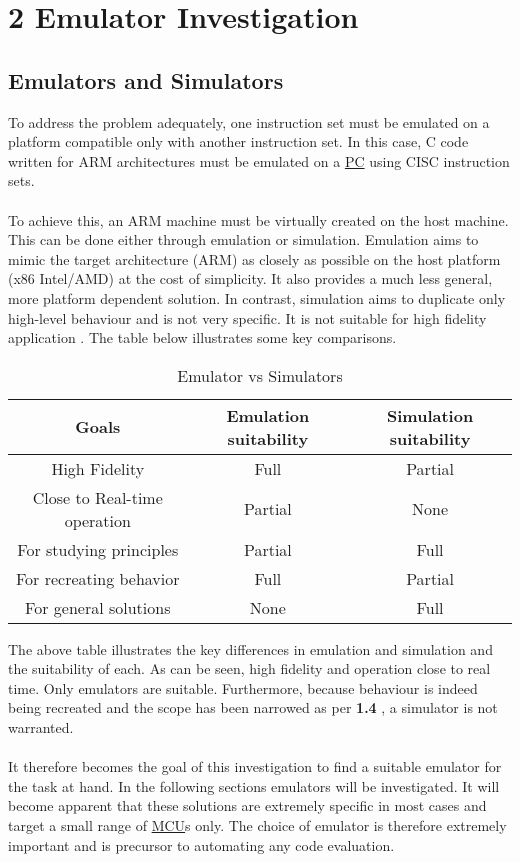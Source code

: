 

\chapter*{2 Emulator Investigation}
\setcounter{chapter}{2}
\setcounter{section}{0}
\setcounter{figure}{0}
\setcounter{table}{0}
\label{2emul}

\section{Emulators and Simulators}
\label{emuVsSim}
To address the problem adequately, one instruction set must be emulated on a platform compatible only with another instruction set. In this case, C code written for ARM architectures must be emulated on a \hyperref[listAbr]{PC} using CISC instruction sets.
\\\\
To achieve this, an ARM machine must be virtually created on the host machine. This can be done either through emulation or simulation. Emulation aims to mimic the target architecture (ARM) as closely as possible on the host platform (x86 Intel/AMD) at the cost of simplicity. It also provides a much less general, more platform dependent solution. In contrast, simulation aims to duplicate only high-level behaviour and is not very specific. It is not suitable for high fidelity application \cite{Chris}. The table below illustrates some key comparisons.

\begin{table}[H]
\begin{tabular}{ |c|c|c| } 
 \hline
 Goals & Emulation suitability & Simulation suitability \\ 
 \hline
 High Fidelity & Full & Partial \\ 
 Close to Real-time operation& Partial & None \\ 
 For studying principles & Partial & Full\\ 
 For recreating behavior & Full & Partial\\ 
 For general solutions & None & Full\\ 
 \hline
\end{tabular}
\caption{Emulator vs Simulators}
\label{table:1}
\end{table}

The above table illustrates the key differences in emulation and simulation and the suitability of each. As can be seen, high fidelity and operation close to real time. Only emulators are suitable. Furthermore, because behaviour is indeed being recreated and the scope has been narrowed as per \textbf{1.4 }, a simulator is not warranted. 
\\\\
It therefore becomes the goal of this investigation to find a suitable emulator for the task at hand. In the following sections emulators will be investigated. It will become apparent that these solutions are extremely specific in most cases and target a small range of \hyperref[listAbr]{MCU}s only. The choice of emulator is therefore extremely important and is precursor to automating any code evaluation.

